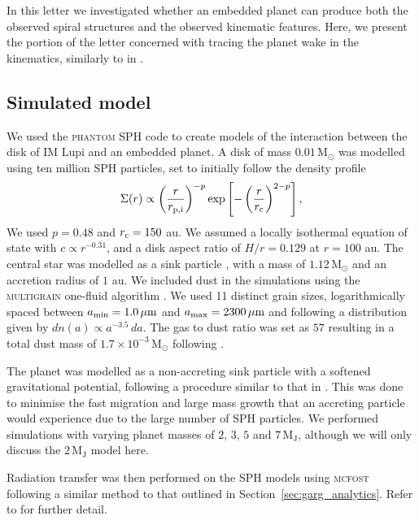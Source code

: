 In this letter we investigated whether an embedded planet can produce both the observed spiral structures and the observed kinematic features.
Here, we present the portion of the letter concerned with tracing the planet wake in the kinematics, similarly to in \citet{calcino2022}.

\subsection{Simulated model}

We used the \textsc{phantom} SPH code \citep{price2018} to create models of the interaction between the disk of IM Lupi and an embedded planet.
A disk of mass $0.01 \, \mathrm{M_\odot}$ was modelled using ten million SPH particles, set to initially follow the density profile
\begin{align}
    \Sigma (r) \propto \left(\frac{r}{r_\mathrm{p,i}}\right)^{-p} \exp \left[-\left(\frac{r}{r_{\rm c}}\right)^{2-p}\right], \label{eq:sigma_phantom}
\end{align}
We used $p=0.48$ \citep{pinte2018} and $r_{\rm c}=150$ au.
We assumed a locally isothermal equation of state with $c \propto r^{-0.31}$, and a disk aspect ratio of $H/r=0.129$ at $r=100$ au.
The central star was modelled as a sink particle \citep{bate1995}, with a mass of $1.12 \, \mathrm{M_\odot}$ \citep{andrews2018} and an accretion radius of $1$ au.
We included dust in the simulations using the \textsc{multigrain} one-fluid algorithm \citep{price2015,ballabio2018,hutchison2018,price2018}.
We used 11 distinct grain sizes, logarithmically spaced between $a_{\rm min}=1.0 \, \mathrm{\mu m}$ and $a_{\rm max}=2300 \, \mathrm{\mu m}$ and following a distribution given by $dn(a) \propto a^{-3.5} \, da$.
The gas to dust ratio was set as $57$ resulting in a total dust mass of $1.7 \times 10^{-3} \, \mathrm{M_\odot}$ following \citep{pinte2018}. 

The planet was modelled as a non-accreting sink particle with a softened gravitational potential, following a procedure similar to that in \citet{szulagyi2016}.
This was done to minimise the fast migration and large mass growth that an accreting particle would experience due to the large number of SPH particles.
We performed simulations with varying planet masses of $2, \, 3, \, 5$ and $7\, \mathrm{M_J}$, although we will only discuss the $2 \, \mathrm{M_J}$ model here.

Radiation transfer was then performed on the SPH models using \textsc{mcfost} \citep{pinte2006,pinte2009} following a similar method to that outlined in Section~\ref{sec:garg_analytics}.
Refer to \citet{verrios2022} for further detail.

